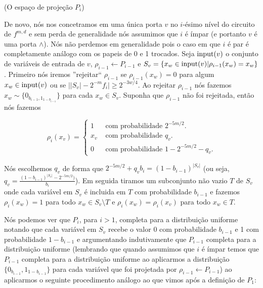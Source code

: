 \begin{defi} (O espaço de projeção $P_{i}$) \label{defi_Pi}

De novo, nós nos concetramos em uma única porta $v$ no $i$-ésimo nível do circuito de $f^{m, d}$ e sem perda de generalidade nós assumimos que $i$ é ímpar (e portanto $v$ é uma porta $\land$). Nós não perdemos em generalidade pois o caso em que $i$ é par é completamente análogo com os papeis de 0 e 1 trocados. Seja $\text{input}(v)$ o conjunto de variáveis de entrada de $v$, $\rho_{i - 1} \leftarrow P_{i - 1}$ e $S_{v} = \{x_{w} \in \text{input}(v) \lvert \rho_{i - 1}(x_{w}) = x_{w}\}$. Primeiro nós iremos ''rejeitar`` $\rho_{i - 1}$ se $\rho_{i - 1}(x_{w}) = 0$ para algum $x_{w} \in \text{input}(v)$ ou se $\big\lvert \lvert S_{v} \rvert - 2^{-m}f_{i} \big\rvert \geq 2^{-3w/4}$. Ao rejeitar $\rho_{i - 1}$ nós fazemos $x_{w} \sim \{0_{b_{i - 1}, 1_{1 - b_{i - 1}}}\}$ para cada $x_{w} \in S_{v}$. Suponha que $\rho_{i - 1}$ não foi rejeitada, então nós fazemos

\begin{equation*}
	\rho_{i}(x_{v}) = \begin{cases}
			        	  1 & \text{ com probabilidade } 2^{-5m/2}. \\
			        	  x_{v} & \text{ com probabilidade } q_{v}. \\
			        	  0 & \text{ com probabilidade } 1 - 2^{-5m/2} - q_{v}.
			        \end{cases}
\end{equation*}

Nós escolhemos $q_{v}$ de forma que $2^{-5m/2} + q_{v}b_{i} = (1 - b_{i - 1})^{\lvert S_{v} \rvert}$ (ou seja, $q_{v} = \frac{(1 - b_{i - 1})^{\lvert S_{v} \rvert} - 2^{-5m/2})}{b_{i}}$). Em seguida tiramos um subconjunto não vazio $T$ de $S_{v}$ onde cada variável em $S_{v}$ é incluida em $T$ com probabilidade $b_{i - 1}$ e fazemos $\rho_{i}(x_{w}) = 1$ para todo $x_{w} \in S_{v} \setminus T$ e $\rho_{i}(x_{w}) = \rho_{i}(x_{v})$ para todo $x_{w} \in T$.

\end{defi}

Nós podemos ver que $P_{i}$, para $i > 1$, completa para a distribuição uniforme notando que cada variável em $S_{v}$ recebe o valor 0 com probabilidade $b_{i - 1}$ e 1 com probabilidade $1 - b_{i - 1}$ e argumentando indutivamente que $P_{i - 1}$ completa para a distribuição uniforme (lembrando que quando assumimos que $i$ é ímpar temos que $P_{i - 1}$ completa para a distribuição uniforme ao aplicarmos a distribuição $\{0_{b_{i - 1}}, 1_{1 - b_{i - 1}}\}$ para cada variável que foi projetada por $\rho_{i - 1} \leftarrow P_{i - 1}$) ao aplicarmos o seguinte procedimento análogo ao que vimos após a definição de $P_{1}$:


